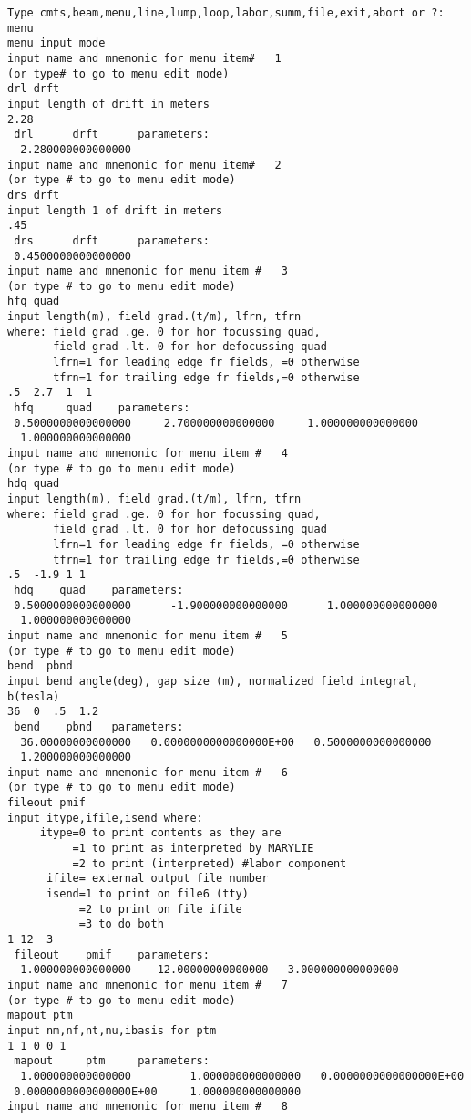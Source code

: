 \begin{footnotesize}
\begin{verbatim}
Type cmts,beam,menu,line,lump,loop,labor,summ,file,exit,abort or ?:
menu
menu input mode
input name and mnemonic for menu item#   1
(or type# to go to menu edit mode)
drl drft
input length of drift in meters
2.28
 drl      drft      parameters:
  2.280000000000000
input name and mnemonic for menu item#   2
(or type # to go to menu edit mode)
drs drft
input length 1 of drift in meters
.45
 drs      drft      parameters:
 0.4500000000000000
input name and mnemonic for menu item #   3
(or type # to go to menu edit mode)
hfq quad
input length(m), field grad.(t/m), lfrn, tfrn
where: field grad .ge. 0 for hor focussing quad,
       field grad .lt. 0 for hor defocussing quad
       lfrn=1 for leading edge fr fields, =0 otherwise
       tfrn=1 for trailing edge fr fields,=0 otherwise
.5  2.7  1  1
 hfq     quad    parameters:
 0.5000000000000000     2.700000000000000     1.000000000000000
  1.000000000000000
input name and mnemonic for menu item #   4
(or type # to go to menu edit mode)
hdq quad
input length(m), field grad.(t/m), lfrn, tfrn
where: field grad .ge. 0 for hor focussing quad,
       field grad .lt. 0 for hor defocussing quad
       lfrn=1 for leading edge fr fields, =0 otherwise
       tfrn=1 for trailing edge fr fields,=0 otherwise
.5  -1.9 1 1
 hdq    quad    parameters:
 0.5000000000000000      -1.900000000000000      1.000000000000000
  1.000000000000000
input name and mnemonic for menu item #   5
(or type # to go to menu edit mode)
bend  pbnd
input bend angle(deg), gap size (m), normalized field integral, b(tesla)
36  0  .5  1.2
 bend    pbnd   parameters:
  36.00000000000000   0.0000000000000000E+00   0.5000000000000000
  1.200000000000000
input name and mnemonic for menu item #   6
(or type # to go to menu edit mode)
fileout pmif
input itype,ifile,isend where:
     itype=0 to print contents as they are
          =1 to print as interpreted by MARYLIE
          =2 to print (interpreted) #labor component
      ifile= external output file number
      isend=1 to print on file6 (tty)
           =2 to print on file ifile
           =3 to do both
1 12  3
 fileout    pmif    parameters:
  1.000000000000000    12.00000000000000   3.000000000000000
input name and mnemonic for menu item #   7
(or type # to go to menu edit mode)
mapout ptm
input nm,nf,nt,nu,ibasis for ptm
1 1 0 0 1
 mapout     ptm     parameters:
  1.000000000000000         1.000000000000000   0.0000000000000000E+00
 0.0000000000000000E+00     1.000000000000000
input name and mnemonic for menu item #   8

\end{verbatim}
\end{footnotesize}
